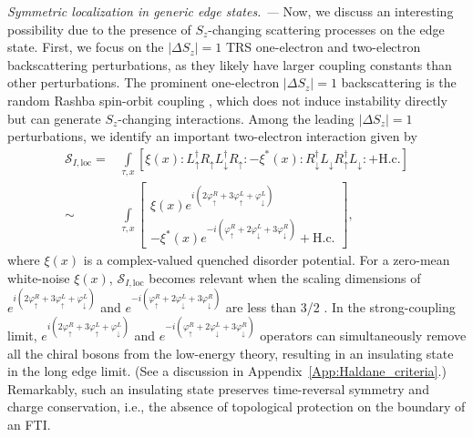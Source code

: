 \documentclass[aps,prx,amsmath,superscriptaddress,twocolumn,bibnotes,longbibliography,floatfix]{revtex4-2}
\begin{document}
	\textit{Symmetric localization in generic edge states. ---} Now, we discuss an interesting possibility due to the presence of $S_z$-changing scattering processes on the edge state. First, we focus on the $|\Delta S_z|=1$ TRS one-electron and two-electron backscattering perturbations, as they likely have larger coupling constants than other perturbations. The prominent one-electron $|\Delta S_z|=1$ backscattering is the random Rashba spin-orbit coupling \cite{XieHY2016}, which does not induce instability directly but can generate $S_z$-changing interactions.
	Among the leading $|\Delta S_z|=1$ perturbations, we identify an important two-electron interaction given by
	\begin{subequations}\label{Eq:S_I_loc}
		\begin{align}
			\mathcal{S}_{I,\text{loc}}=&\!\int\limits_{\tau,x}\!\left[\xi(x):L^{\dagger}_{\uparrow}R_{\uparrow}L^{\dagger}_{\downarrow}R_{\uparrow}:-\xi^*(x):R^{\dagger}_{\downarrow}L_{\downarrow}R^{\dagger}_{\uparrow}L_{\downarrow}:+\text{H.c.}\right]\\
			\sim&\!\int\limits_{\tau,x}\!\left[\begin{array}{c}
				\xi(x)e^{i(2\varphi^R_{\uparrow}+3\varphi^L_{\uparrow}+\varphi^L_{\downarrow})}\\[1mm]
				-\xi^*(x)e^{-i(\varphi^R_{\uparrow}+2\varphi^L_{\downarrow}+3\varphi^R_{\downarrow})}+\text{H.c.}
			\end{array}\right],
		\end{align}
	\end{subequations}
	where $\xi(x)$ is a complex-valued quenched disorder potential. For a zero-mean white-noise $\xi(x)$, $\mathcal{S}_{I,\text{loc}}$ becomes relevant when the scaling dimensions of $e^{i(2\varphi^R_{\uparrow}+3\varphi^L_{\uparrow}+\varphi^L_{\downarrow})}$ and $e^{-i(\varphi^R_{\uparrow}+2\varphi^L_{\downarrow}+3\varphi^R_{\downarrow})}$ are less than 3/2 \cite{GiamarchiT1988,GiamarchiT2003}. In the strong-coupling limit, $e^{i(2\varphi^R_{\uparrow}+3\varphi^L_{\uparrow}+\varphi^L_{\downarrow})}$ and $e^{-i(\varphi^R_{\uparrow}+2\varphi^L_{\downarrow}+3\varphi^R_{\downarrow})}$ operators can simultaneously remove all the chiral bosons from the low-energy theory, resulting in an insulating state in the long edge limit. (See a discussion in Appendix~\ref{App:Haldane_criteria}.) Remarkably, such an insulating state preserves time-reversal symmetry and charge conservation, i.e., the absence of topological protection on the boundary of an FTI.
\end{document}
